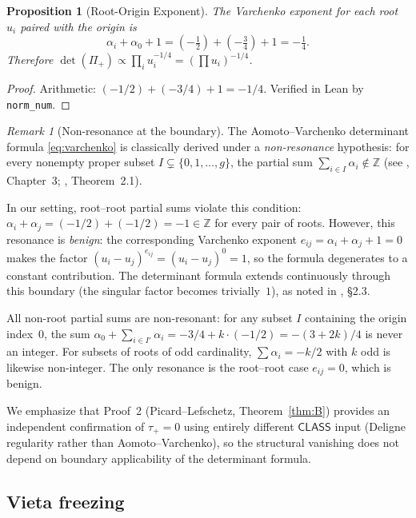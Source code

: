 \documentclass[11pt]{article}
\theoremstyle{plain}
\newtheorem{proposition}[theorem]{Proposition}
\theoremstyle{definition}
\theoremstyle{remark}
\newtheorem{remark}[theorem]{Remark}
\newcommand{\ZZ}{\mathbb{Z}}
\newcommand{\CLASS}{\mathsf{CLASS}}
\begin{document}
\begin{proposition}[Root-Origin Exponent]\label{prop:ro}
  The Varchenko exponent for each root $u_i$ paired with the origin is
  \[
    \alpha_i + \alpha_0 + 1 = (-\tfrac{1}{2}) + (-\tfrac{3}{4}) + 1 = -\tfrac{1}{4}.
  \]
  Therefore $\det(\Pi_+) \propto \prod_i u_i^{-1/4} = (\prod u_i)^{-1/4}$.
\end{proposition}

\begin{proof}
  Arithmetic: $(-1/2) + (-3/4) + 1 = -1/4$.  Verified in Lean by \texttt{norm\_num}.
\end{proof}

\begin{remark}[Non-resonance at the boundary]\label{rmk:resonance}
The Aomoto--Varchenko determinant formula \eqref{eq:varchenko} is classically
derived under a \emph{non-resonance} hypothesis: for every nonempty proper
subset $I \subsetneq \{0, 1, \ldots, g\}$, the partial sum
$\sum_{i \in I} \alpha_i \notin \ZZ$ (see \cite{aomoto}, Chapter~3;
\cite{varchenko}, Theorem~2.1).

In our setting, root--root partial sums violate this condition:
$\alpha_i + \alpha_j = (-1/2) + (-1/2) = -1 \in \ZZ$ for every pair of
roots.  However, this resonance is \emph{benign}: the corresponding
Varchenko exponent $e_{ij} = \alpha_i + \alpha_j + 1 = 0$ makes the
factor $(u_i - u_j)^{e_{ij}} = (u_i - u_j)^0 = 1$, so the formula
degenerates to a constant contribution.  The determinant formula
extends continuously through this boundary (the singular factor
becomes trivially~$1$), as noted in \cite{varchenko}, \S2.3.

All non-root partial sums are non-resonant: for any subset $I$ containing
the origin index~$0$, the sum $\alpha_0 + \sum_{i \in I'} \alpha_i
= -3/4 + k \cdot (-1/2) = -(3 + 2k)/4$ is never an integer.  For subsets
of roots of odd cardinality, $\sum \alpha_i = -k/2$ with $k$ odd is
likewise non-integer.  The only resonance is the root--root case
$e_{ij} = 0$, which is benign.

We emphasize that Proof~2 (Picard--Lefschetz, Theorem~\ref{thm:B}) provides
an independent confirmation of $\tau_+ = 0$ using entirely different
$\CLASS$ input (Deligne regularity rather than Aomoto--Varchenko),
so the structural vanishing does not depend on boundary applicability
of the determinant formula.
\end{remark}

\subsection{Vieta freezing}
\end{document}
